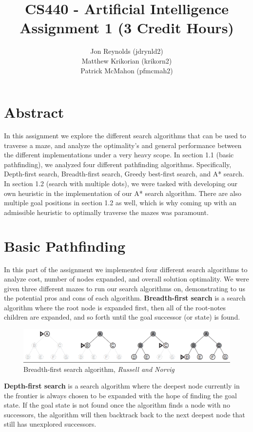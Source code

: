 \documentclass[titlepage]{article}
\title{CS440 - Artificial Intelligence \\ Assignment 1 (3 Credit Hours)}
\author{Jon Reynolds (jdrynld2) \\ Matthew Krikorian (krikorn2) \\ Patrick McMahon (pfmcmah2)}
\begin{document}
\maketitle

\section{Abstract}
In this assignment we explore the different search algorithms that can be used to traverse a maze, and analyze the optimality's and general performance between the different implementations under a very heavy scope. In section 1.1 (basic pathfinding), we analyzed four different pathfinding algorithms. Specifically, Depth-first search, Breadth-first search, Greedy best-first search, and A* search. In section 1.2 (search with multiple dots), we were tasked with developing our own heuristic in the implementation of our A* search algorithm. There are also multiple goal positions in section 1.2 as well, which is why coming up with an admissible heuristic to optimally traverse the mazes was paramount.

\section{Basic Pathfinding} 
In this part of the assignment we implemented four different search algorithms to analyze cost, number of nodes expanded, and overall solution optimality. We were given three different mazes to run our search algorithms on, demonstrating to us the potential pros and cons of each algorithm. \textbf{Breadth-first search} is a search algorithm where the root node is expanded first, then all of the root-notes children are expanded, and so forth until the goal successor (or state) is found. 

\begin{figure}[h!]
\includegraphics[width=\linewidth]{bfs.png}
\caption{Breadth-first search algorithm, \textit{Russell and Norvig}}
\label{fig:BFSdiagram1}
\end{figure}

\noindent
\textbf{Depth-first search} is a search algorithm where the deepest node currently in the frontier is always chosen to be expanded with the hope of finding the goal state. If the goal state is not found once the algorithm finds a node with no successors, the algorithm will then backtrack back to the next deepest node that still has unexplored successors.
\end{document}
